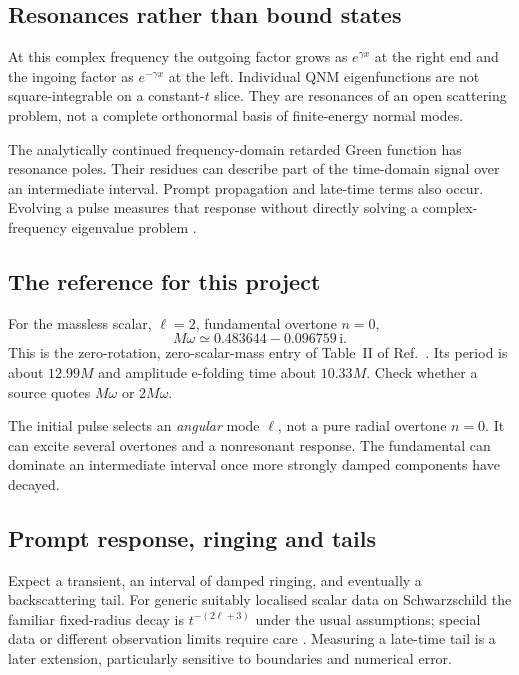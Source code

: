 \documentclass[11pt,a4paper]{article}
\numberwithin{equation}{section}
\newcommand{\ii}{\mathrm{i}}
\begin{document}
\subsection{Resonances rather than bound states}
At this complex frequency the outgoing factor grows as $e^{\gamma x}$
at the right end and the ingoing factor as $e^{-\gamma x}$ at the left.
Individual QNM eigenfunctions are not square-integrable on a constant-$t$
slice. They are resonances of an open scattering problem, not a complete
orthonormal basis of finite-energy normal modes.

The analytically continued frequency-domain retarded Green function has
resonance poles. Their residues can describe part of the time-domain signal
over an intermediate interval. Prompt propagation and late-time terms also
occur. Evolving a pulse measures that response without directly solving a
complex-frequency eigenvalue problem \cite{berti}.

\subsection{The reference for this project}
For the massless scalar, $\ell=2$, fundamental overtone $n=0$,
\begin{equation}\label{eq:reference}
 M\omega\simeq0.483644-0.096759\,\ii .
\end{equation}
This is the zero-rotation, zero-scalar-mass entry of Table~II of
Ref.~\cite{dolan}. Its period is about $12.99M$ and amplitude e-folding
time about $10.33M$. Check whether a source quotes $M\omega$ or
$2M\omega$.

The initial pulse selects an \emph{angular} mode $\ell$, not a pure radial
overtone $n=0$. It can excite several overtones and a nonresonant response.
The fundamental can dominate an intermediate interval once more strongly
damped components have decayed.

\subsection{Prompt response, ringing and tails}
Expect a transient, an interval of damped ringing, and eventually a
backscattering tail. For generic suitably localised scalar data on
Schwarzschild the familiar fixed-radius decay is $t^{-(2\ell+3)}$ under
the usual assumptions; special data or different observation limits require
care \cite{price}. Measuring a late-time tail is a later extension,
particularly sensitive to boundaries and numerical error.
\end{document}
